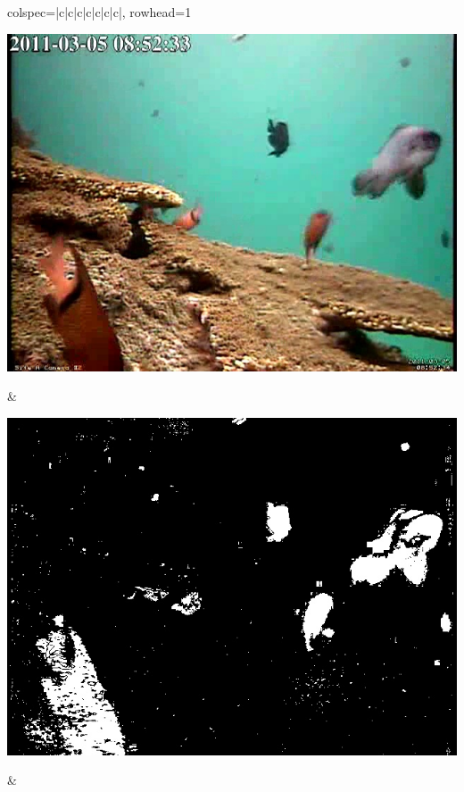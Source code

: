 \begin{longtblr}[
            caption = {Hasil uji coba proses \textit{background subtraction} menggunakan GMM terhadap video indeks gt\textunderscore124},
            label = {tab:gmm_124}
        ]{
            colspec={|c|c|c|c|c|c|c|},
            rowhead=1
        }
\begin{minipage}{0.24\textwidth}
                \includegraphics[width=\linewidth]{image/gt_124/gt_124_original_frame1191.jpg}
            \end{minipage} &
            \begin{minipage}{0.24\textwidth}
                \includegraphics[width=\linewidth]{image/gt_124/gt_124_gmm_frame1191.jpg}
            \end{minipage} &
           \begin{minipage}{0.24\textwidth}

\end{minipage}
\end{longtblr}
